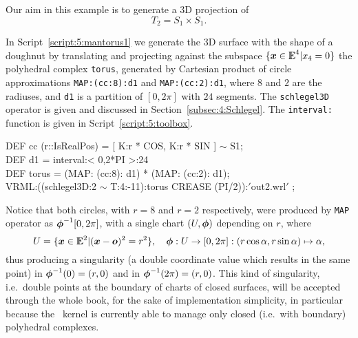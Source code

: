 \documentclass{31x47jw}
\begin{document}
\begin{example}
    
Our aim in this example is to generate a 3D projection of 
\[
T_{2} = S_{1} \times S_{1}.
\]
    
In Script~\ref{script:5:mantorus1} we generate the 3D surface with the
shape of a doughnut by translating and projecting against the subspace
$\{{\mbox{\boldmath $x$}}\in\mathbb{I\!\!E}^{4} | x_{4}=0\}$ the polyhedral complex \texttt{torus},
generated by Cartesian product of circle approximations
\texttt{MAP:(cc:8):d1} and \texttt{MAP:(cc:2):d1}, where $8$ and $2$ are
the radiuses, and \texttt{d1} is a partition of $[0, 2\pi]$ with $24$
segments.  The \texttt{schlegel3D} operator is given and discussed in
Section~\ref{subsec:4:Schlegel}.  The \texttt{interval:} function is
given in Script~\ref{script:5:toolbox}.

\begin{script}
\begin{smallplasm} 
DEF cc (r::IsRealPos) = [ K:r * COS, K:r * SIN ]  $\sim$  S1;\\
DEF d1 = interval:< 0,2*PI >:24\\
DEF torus  = (MAP: (cc:8): d1) * (MAP: (cc:2): d1);\\[0.3cm]

VRML:((schlegel3D:2  $\sim$  T:4:-11):torus CREASE (PI/2)):$'$out2.wrl$'$ ;
\end{smallplasm} 
\label{script:5:mantorus1}
\end{script}

Notice that both circles, with $r=8$ and $r=2$ respectively, were
produced by \texttt{MAP} operator as ${\mbox{\boldmath $\phi$}}^{-1}[0,2\pi]$, with a
single chart $(U,{\mbox{\boldmath $\phi$}})$ depending on $r$, where
\[ 
U = \{{\mbox{\boldmath $x$}}\in\mathbb{I\!\!E}^{2} | ({\mbox{\boldmath $x$}}-{\mbox{\boldmath $o$}})^{2} = r^{2}\}, \quad {\mbox{\boldmath $\phi$}} :
U\rightarrow[0,2\pi] : (r\cos\alpha, r\sin\alpha)\mapsto\alpha ,
\]
thus producing a singularity (a double coordinate value which results in
the same point) in ${\mbox{\boldmath $\phi$}}^{-1}(0)= (r,0)$ and in
${\mbox{\boldmath $\phi$}}^{-1}(2\pi)=(r,0)$.  This kind of singularity, i.e.~double
points at the boundary of charts of closed surfaces, will be accepted
through the whole book, for the sake of implementation simplicity, in
particular because the \pl\ kernel is currently able to manage only
closed (i.e.~with boundary) polyhedral complexes.

\label{ex:5:torus2}
\end{example}
    
\end{document}
